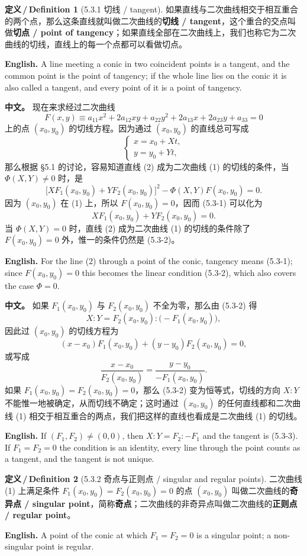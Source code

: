 \documentclass[UTF8,11pt,a4paper]{ctexart}
\newcommand{\APS}[2]{\par\noindent\textbf{中文。} #1\par\noindent\textbf{English.} #2\par\smallskip}
\newcommand{\EN}[1]{\par\noindent \textbf{English.} #1\par}
\theoremstyle{definition}
\newtheorem*{definition}{定义\,/\,Definition}
\begin{document}
\begin{definition}[5.3.1 切线 / tangent]\label{def:tangent}
如果直线与二次曲线相交于相互重合的两个点，那么这条直线就叫做二次曲线的\textbf{切线 / tangent}，这个重合的交点叫做\textbf{切点 / point of tangency}；如果直线全部在二次曲线上，我们也称它为二次曲线的切线，直线上的每一个点都可以看做切点。
\EN{A line meeting a conic in two coincident points is a tangent, and the common point is the point of tangency; if the whole line lies on the conic it is also called a tangent, and every point of it is a point of tangency.}
\end{definition}

\APS{现在来求经过二次曲线
\[
F(x,y)\equiv a_{11}x^2+2a_{12}xy+a_{22}y^2+2a_{13}x+2a_{23}y+a_{33}=0\tag{1}
\]
上的点 $(x_0,y_0)$ 的切线方程。因为通过 $(x_0,y_0)$ 的直线总可写成
\[
\begin{cases}x=x_0+Xt,\\ y=y_0+Yt,\end{cases}\tag{2}
\]
那么根据 §5.1 的讨论，容易知道直线 (2) 成为二次曲线 (1) 的切线的条件，当 $\Phi(X,Y)\ne0$ 时，是
\[
\bigl[XF_1(x_0,y_0)+YF_2(x_0,y_0)\bigr]^2-\Phi(X,Y)F(x_0,y_0)=0.\tag{5.3-1}
\]
因为 $(x_0,y_0)$ 在 (1) 上，所以 $F(x_0,y_0)=0$，因而 (5.3-1) 可以化为
\[
XF_1(x_0,y_0)+YF_2(x_0,y_0)=0.\tag{5.3-2}
\]
当 $\Phi(X,Y)=0$ 时，直线 (2) 成为二次曲线 (1) 的切线的条件除了 $F(x_0,y_0)=0$ 外，惟一的条件仍然是 (5.3-2)。}{For the line (2) through a point of the conic, tangency means (5.3-1); since $F(x_0,y_0)=0$ this becomes the linear condition (5.3-2), which also covers the case $\Phi=0$.}

\APS{如果 $F_1(x_0,y_0)$ 与 $F_2(x_0,y_0)$ 不全为零，那么由 (5.3-2) 得
\[
X:Y=F_2(x_0,y_0):\bigl(-F_1(x_0,y_0)\bigr),
\]
因此过 $(x_0,y_0)$ 的切线方程为
\[
(x-x_0)F_1(x_0,y_0)+(y-y_0)F_2(x_0,y_0)=0,\tag{5.3-3}
\]
或写成
\[
\frac{x-x_0}{F_2(x_0,y_0)}=\frac{y-y_0}{-F_1(x_0,y_0)}.
\]
如果 $F_1(x_0,y_0)=F_2(x_0,y_0)=0$，那么 (5.3-2) 变为恒等式，切线的方向 $X:Y$ 不能惟一地被确定，从而切线不确定；这时通过 $(x_0,y_0)$ 的任何直线都和二次曲线 (1) 相交于相互重合的两点，我们把这样的直线也看成是二次曲线 (1) 的切线。}{If $(F_1,F_2)\ne(0,0)$, then $X:Y=F_2:-F_1$ and the tangent is (5.3-3). If $F_1=F_2=0$ the condition is an identity, every line through the point counts as a tangent, and the tangent is not unique.}

\begin{definition}[5.3.2 奇点与正则点 / singular and regular points]\label{def:singular}
二次曲线 (1) 上满足条件 $F_1(x_0,y_0)=F_2(x_0,y_0)=0$ 的点 $(x_0,y_0)$ 叫做二次曲线的\textbf{奇异点 / singular point}，简称\textbf{奇点}；二次曲线的非奇异点叫做二次曲线的\textbf{正则点 / regular point}。
\EN{A point of the conic at which $F_1=F_2=0$ is a singular point; a non-singular point is regular.}
\end{definition}
\end{document}
